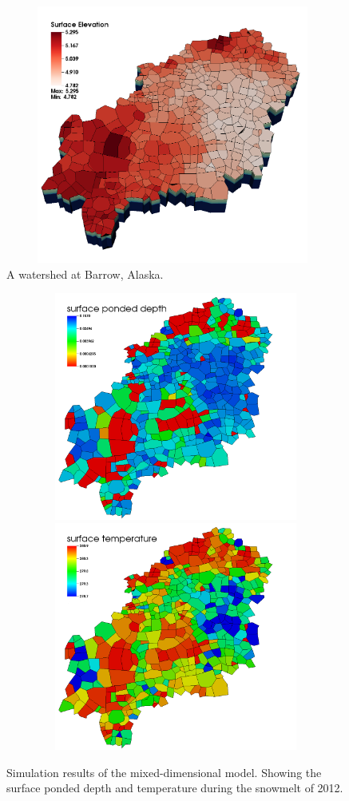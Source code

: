 \documentclass[review,11pt]{elsarticle}
\begin{document}
\begin{figure}[!htpb]
\centering
\includegraphics[height = 8.5cm, width=11cm]{figures/barrow-watershed-image-3.png}
\caption{A watershed at Barrow, Alaska.}
\label{barrow-468}
\end{figure}
 
 \begin{figure}[!htpb]
\centering
\includegraphics[height = 7.5cm, width=12cm]{figures/surface-ponded-depth3-time13-4507.png} \\
\includegraphics[height = 7.5cm, width=12cm]{figures/surface-temperature3-time13-4644.png}
\caption{Simulation results of the mixed-dimensional model. Showing the surface ponded depth and temperature during the snowmelt of 2012.}
\label{barrow-pd-temp}
\end{figure}
\end{document}
